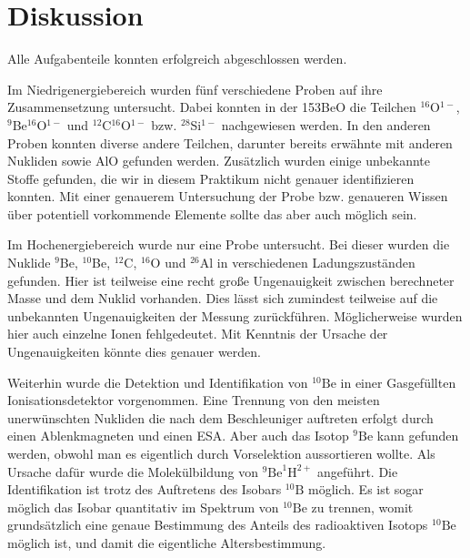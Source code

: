 \section{Diskussion}

Alle Aufgabenteile konnten erfolgreich abgeschlossen werden.

Im Niedrigenergiebereich wurden fünf verschiedene Proben auf ihre Zusammensetzung untersucht.
Dabei konnten in der 153BeO die Teilchen $^{16}$O$^{1-}$, $^{9}$Be$^{16}$O$^{1-}$ und $^{12}$C$^{16}$O$^{1-}$ bzw. $^{28}$Si$^{1-}$ nachgewiesen werden.
In den anderen Proben konnten diverse andere Teilchen, darunter bereits erwähnte mit anderen Nukliden sowie AlO gefunden werden.
Zusätzlich wurden einige unbekannte Stoffe gefunden, die wir in diesem Praktikum nicht genauer identifizieren konnten.
Mit einer genauerem Untersuchung der Probe bzw. genaueren Wissen über potentiell vorkommende Elemente sollte das aber auch möglich sein.

Im Hochenergiebereich wurde nur eine Probe untersucht.
Bei dieser wurden die Nuklide $^{9}$Be, $^{10}$Be, $^{12}$C, $^{16}$O und $^{26}$Al in verschiedenen Ladungszuständen gefunden.
Hier ist teilweise eine recht große Ungenauigkeit zwischen berechneter Masse und dem Nuklid vorhanden.
Dies lässt sich zumindest teilweise auf die unbekannten Ungenauigkeiten der Messung zurückführen.
Möglicherweise wurden hier auch einzelne Ionen fehlgedeutet.
Mit Kenntnis der Ursache der Ungenauigkeiten könnte dies genauer werden.

Weiterhin wurde die Detektion und Identifikation von $^{10}\text{Be}$ in einer Gasgefüllten Ionisationsdetektor vorgenommen.
Eine Trennung von den meisten unerwünschten Nukliden die nach dem Beschleuniger auftreten erfolgt durch einen Ablenkmagneten und einen ESA.
Aber auch das Isotop $^{9}\text{Be}$ kann gefunden werden, obwohl man es eigentlich durch Vorselektion aussortieren wollte.
Als Ursache dafür wurde die Molekülbildung von $^{9}\text{Be}^{1}\text{H}^{2+}$ angeführt.
Die Identifikation ist trotz des Auftretens des Isobars $^{10}\text{B}$ möglich.
Es ist sogar möglich das Isobar quantitativ im Spektrum von $^{10}\text{Be}$ zu trennen, womit grundsätzlich eine genaue Bestimmung des Anteils des radioaktiven Isotops $^{10}\text{Be}$ möglich ist, und damit die eigentliche Altersbestimmung.

